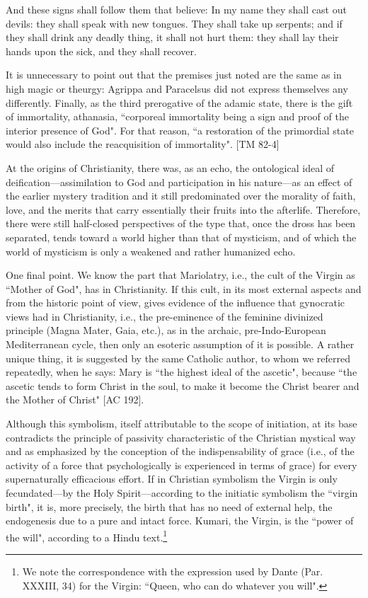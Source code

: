 \begin{quotex}
And these signs shall follow them that believe: In my name they shall cast out devils: they shall speak with new tongues. They shall take up serpents; and if they shall drink any deadly thing, it shall not hurt them: they shall lay their hands upon the sick, and they shall recover. 

\end{quotex}
It is unnecessary to point out that the premises just noted are the same as in high magic or theurgy: Agrippa and Paracelsus did not express themselves any differently. Finally, as the third prerogative of the adamic state, there is the gift of immortality, athanasia, ``corporeal immortality being a sign and proof of the interior presence of God". For that reason, ``a restoration of the primordial state would also include the reacquisition of immortality". [TM 82-4]

At the origins of Christianity, there was, as an echo, the ontological ideal of deification—assimilation to God and participation in his nature—as an effect of the earlier mystery tradition and it still predominated over the morality of faith, love, and the merits that carry essentially their fruits into the afterlife. Therefore, there were still half-closed perspectives of the type that, once the dross has been separated, tends toward a world higher than that of mysticism, and of which the world of mysticism is only a weakened and rather humanized echo.

One final point. We know the part that Mariolatry, i.e., the cult of the Virgin as ``Mother of God", has in Christianity. If this cult, in its most external aspects and from the historic point of view, gives evidence of the influence that gynocratic views had in Christianity, i.e., the pre-eminence of the feminine divinized principle (Magna Mater, Gaia, etc.), as in the archaic, pre-Indo-European Mediterranean cycle, then only an esoteric assumption of it is possible. A rather unique thing, it is suggested by the same Catholic author, to whom we referred repeatedly, when he says: Mary is ``the highest ideal of the ascetic", because ``the ascetic tends to form Christ in the soul, to make it become the Christ bearer and the Mother of Christ" [AC 192].

Although this symbolism, itself attributable to the scope of initiation, at its base contradicts the principle of passivity characteristic of the Christian mystical way and as emphasized by the conception of the indispensability of grace (i.e., of the activity of a force that psychologically is experienced in terms of grace) for every supernaturally efficacious effort. If in Christian symbolism the Virgin is only fecundated—by the Holy Spirit—according to the initiatic symbolism the ``virgin birth", it is, more precisely, the birth that has no need of external help, the endogenesis due to a pure and intact force. Kumari, the Virgin, is the ``power of the will", according to a Hindu text.\footnote{We note the correspondence with the expression used by Dante (Par. XXXIII, 34) for the Virgin: ``Queen, who can do whatever you will".}

